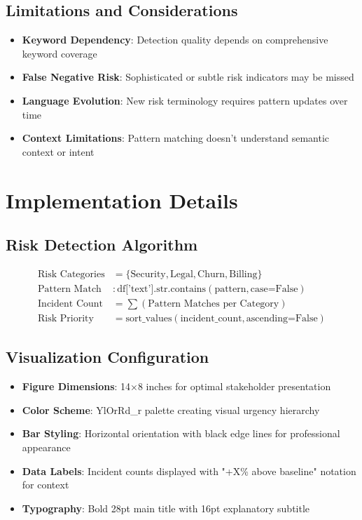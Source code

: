 \documentclass[11pt]{article}
\begin{document}
\subsection{Limitations and Considerations}
\begin{itemize}
\item \textbf{Keyword Dependency}: Detection quality depends on comprehensive keyword coverage
\item \textbf{False Negative Risk}: Sophisticated or subtle risk indicators may be missed
\item \textbf{Language Evolution}: New risk terminology requires pattern updates over time
\item \textbf{Context Limitations}: Pattern matching doesn't understand semantic context or intent
\end{itemize}

\section{Implementation Details}

\subsection{Risk Detection Algorithm}
\begin{align}
\text{Risk Categories} &= \{\text{Security}, \text{Legal}, \text{Churn}, \text{Billing}\} \\
\text{Pattern Match} &: \text{df['text'].str.contains}(\text{pattern}, \text{case=False}) \\
\text{Incident Count} &= \sum(\text{Pattern Matches per Category}) \\
\text{Risk Priority} &= \text{sort\_values}(\text{incident\_count}, \text{ascending=False})
\end{align}

\subsection{Visualization Configuration}
\begin{itemize}
\item \textbf{Figure Dimensions}: 14×8 inches for optimal stakeholder presentation
\item \textbf{Color Scheme}: YlOrRd\_r palette creating visual urgency hierarchy
\item \textbf{Bar Styling}: Horizontal orientation with black edge lines for professional appearance
\item \textbf{Data Labels}: Incident counts displayed with "+X\% above baseline" notation for context
\item \textbf{Typography}: Bold 28pt main title with 16pt explanatory subtitle
\end{itemize}
\end{document}
